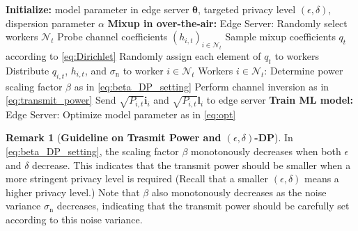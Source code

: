 \documentclass[conference,10pt]{IEEEtran}
\theoremstyle{definition}
\theoremstyle{definition}
\newtheorem{remark}{Remark}
\renewcommand{\baselinestretch}{0.85}
\begin{document}
\begingroup
\renewcommand{\baselinestretch}{0.7}
\begin{algorithm}[t]
	\small
	\caption{AirMixML with \textsf{DP($\epsilon$)-DirMix($\alpha$)-PC}}
	\label{alg:AirMixML_w_PC}
	\begin{algorithmic}[1]
		\State \textbf{Initialize:} model parameter in edge server $\bm{\theta}$, targeted privacy level $(\epsilon, \delta)$, dispersion parameter $\alpha$
		\State \textbf{Mixup in over-the-air:}
		\State Edge Server:
		\State \hspace{\algorithmicindent} Randomly select workers $\mathcal{N}_t$
		\State \hspace{\algorithmicindent} Probe channel coefficients $(h_{i, t})_{i\in\mathcal{N}_t}$
		\State \hspace{\algorithmicindent} Sample mixup coefficients $q_t$ according to \eqref{eq:Dirichlet}
		\State \hspace{\algorithmicindent} Randomly assign each element of $q_t$ to workers
		\State \hspace{\algorithmicindent} Distribute $q_{i, t}$, $h_{i, t}$, and $\sigma_{\mathrm{n}}$ to worker $i\in\mathcal{N}_t$
		\State Workers $i\in\mathcal{N}_t$:
		\State \hspace{\algorithmicindent} Determine power scaling factor $\beta$ as in \eqref{eq:beta_DP_setting}
		\State \hspace{\algorithmicindent} Perform channel inversion as in \eqref{eq:transmit_power}
		\State \hspace{\algorithmicindent} Send $\sqrt{P_{i, t}}\bm i_{i}$ and $\sqrt{P_{i, t}}\bm l_{i}$ to edge server
		\EndFor
		\State \textbf{Train ML model:}
		\State Edge Server:
		\State \hspace{\algorithmicindent} Optimize model parameter as in \eqref{eq:opt}
	\end{algorithmic}
\end{algorithm}
\endgroup

\vspace{-1em}
\begin{remark}[\textbf{Guideline on Trasmit Power and $(\epsilon,\delta)$-DP}]
	In \eqref{eq:beta_DP_setting}, the scaling factor $\beta$ monotonously decreases when both $\epsilon$ and $\delta$ decrease.
	This indicates that the transmit power should be smaller when a more stringent privacy level is required (Recall that a smaller $(\epsilon, \delta)$ means a higher privacy level.)
	Note that $\beta$ also monotonously decreases as the noise variance $\sigma_{\mathrm{n}}$ decreases, indicating that the transmit power should be carefully set according to this noise variance.
\end{remark}
\end{document}
